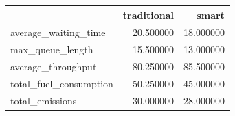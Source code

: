 \begin{tabular}{lrr}
\toprule
 & traditional & smart \\
\midrule
average_waiting_time & 20.500000 & 18.000000 \\
max_queue_length & 15.500000 & 13.000000 \\
average_throughput & 80.250000 & 85.500000 \\
total_fuel_consumption & 50.250000 & 45.000000 \\
total_emissions & 30.000000 & 28.000000 \\
\bottomrule
\end{tabular}
